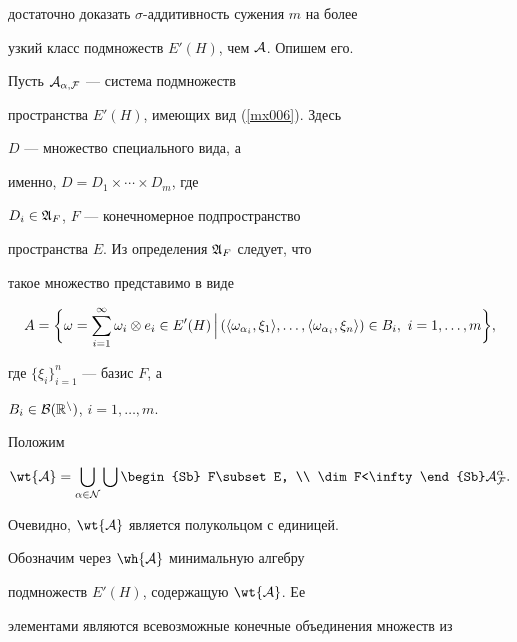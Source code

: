 достаточно доказать $\sigma$-аддитивность сужения $m$ на более


узкий класс подмножеств $E'(H)$, чем $\cal{A}$. Опишем его.





Пусть $\cal{A}_{\alpha,F}$ --- система подмножеств


пространства $E'(H)$, имеющих вид (\ref{mx006}). Здесь


$D$ --- множество специального вида, а


именно, $D=D_1\times \dotsb\times D_m$, где


$D_i\in\frak{A}_F$, $F$ --- конечномерное подпространство


пространства $E$. Из определения $\frak{A}_F$ следует, что


такое множество представимо в виде


\begin{equation}\label{mx008}


A= \bigg\{\omega=\sum_{i=1}^{\infty}\omega_i\otimes e_i\in


E'(H)\,\Big |\, (\la \omega_{\alpha_i},\xi_1\ra,


\dotsc,\la \omega_{\alpha_i},\xi_n\ra)\in B_i,\ i=1,\dotsc,m \bigg\},


\end{equation}


где $\{\xi_i\}_{i=1}^n$ --- базис $F$, а


$B_i\in\cal{B}(\Bbb{R}^n)$, $i=1,\dotsc,m$.





Положим


$$


\wt{\cal{A}}=\bigcup\limits_{\alpha\in\cal{N}}


\bigcup\limits \begin{Sb} F\subset E, \\ \dim F<\infty \end{Sb}


\cal{A}_F^{\alpha}.


$$


Очевидно, $\wt{\cal{A}}$ является полукольцом с единицей.


Обозначим через $\wh{\cal{A}}$ минимальную алгебру


подмножеств $E'(H)$, содержащую $\wt{\cal{A}}$. Ее


элементами являются всевозможные конечные объединения множеств из



